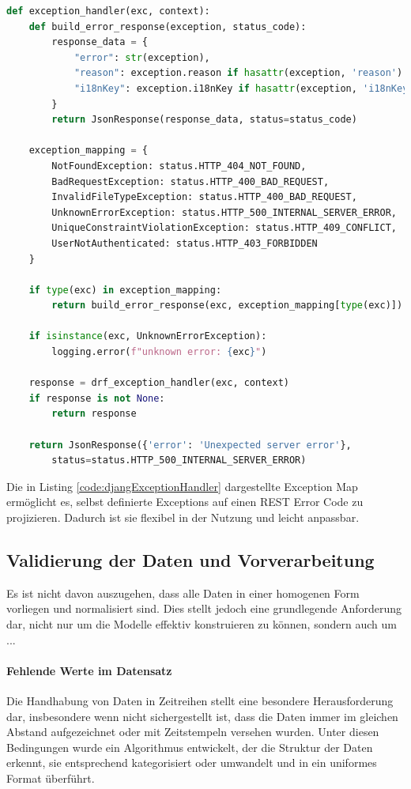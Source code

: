 \begin{lstlisting}[language=Python, caption={Exception Handler}, label={code:djangExceptionHandler}]
def exception_handler(exc, context):
    def build_error_response(exception, status_code):
        response_data = {
            "error": str(exception),
            "reason": exception.reason if hasattr(exception, 'reason') else None,
            "i18nKey": exception.i18nKey if hasattr(exception, 'i18nKey') else "UNDEFINED"
        }
        return JsonResponse(response_data, status=status_code)

    exception_mapping = {
        NotFoundException: status.HTTP_404_NOT_FOUND,
        BadRequestException: status.HTTP_400_BAD_REQUEST,
        InvalidFileTypeException: status.HTTP_400_BAD_REQUEST,
        UnknownErrorException: status.HTTP_500_INTERNAL_SERVER_ERROR,
        UniqueConstraintViolationException: status.HTTP_409_CONFLICT,
        UserNotAuthenticated: status.HTTP_403_FORBIDDEN
    }

    if type(exc) in exception_mapping:
        return build_error_response(exc, exception_mapping[type(exc)])

    if isinstance(exc, UnknownErrorException):
        logging.error(f"unknown error: {exc}")

    response = drf_exception_handler(exc, context)
    if response is not None:
        return response

    return JsonResponse({'error': 'Unexpected server error'}, 
        status=status.HTTP_500_INTERNAL_SERVER_ERROR)
\end{lstlisting}

Die in Listing \ref{code:djangExceptionHandler} dargestellte Exception Map ermöglicht es, selbst definierte Exceptions auf einen \ac{REST} Error Code zu projizieren. Dadurch ist sie flexibel in der Nutzung und leicht anpassbar.


\subsection{Validierung der Daten und Vorverarbeitung}
\label{sec:djangoDataPreprocessing}
Es ist nicht davon auszugehen, dass alle Daten in einer homogenen Form vorliegen und normalisiert sind. Dies stellt jedoch eine grundlegende Anforderung dar, nicht nur um die Modelle effektiv konstruieren zu können, sondern auch um ...

\paragraph*{Fehlende Werte im Datensatz}
Die Handhabung von Daten in Zeitreihen stellt eine besondere Herausforderung dar, insbesondere wenn nicht sichergestellt ist, dass die Daten immer im gleichen Abstand aufgezeichnet oder mit Zeitstempeln versehen wurden. Unter diesen Bedingungen wurde ein Algorithmus entwickelt, der die Struktur der Daten erkennt, sie entsprechend kategorisiert oder umwandelt und in ein uniformes Format überführt.


